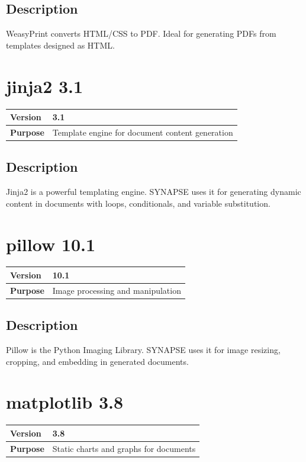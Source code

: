 \documentclass[12pt,a4paper]{report}
\begin{document}
\subsection{Description}

WeasyPrint converts HTML/CSS to PDF. Ideal for generating PDFs from templates designed as HTML.

\section{jinja2 3.1}

\begin{tabular}{|p{4cm}|p{10cm}|}
\hline
\textbf{Version} & 3.1 \\
\hline
\textbf{Purpose} & Template engine for document content generation \\
\hline
\end{tabular}

\subsection{Description}

Jinja2 is a powerful templating engine. SYNAPSE uses it for generating dynamic content in documents with loops, conditionals, and variable substitution.

\section{pillow 10.1}

\begin{tabular}{|p{4cm}|p{10cm}|}
\hline
\textbf{Version} & 10.1 \\
\hline
\textbf{Purpose} & Image processing and manipulation \\
\hline
\end{tabular}

\subsection{Description}

Pillow is the Python Imaging Library. SYNAPSE uses it for image resizing, cropping, and embedding in generated documents.

\section{matplotlib 3.8}

\begin{tabular}{|p{4cm}|p{10cm}|}
\hline
\textbf{Version} & 3.8 \\
\hline
\textbf{Purpose} & Static charts and graphs for documents \\
\hline
\end{tabular}
\end{document}
